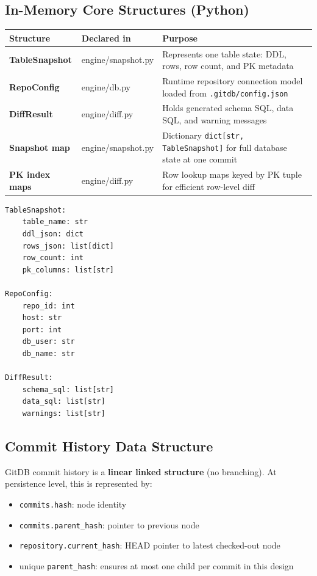 \documentclass[12pt, a4paper]{article}
\begin{document}
\subsection{In-Memory Core Structures (Python)}

\begin{center}
\renewcommand{\arraystretch}{1.3}
\begin{tabularx}{\textwidth}{>{\bfseries}p{3.0cm} >{\ttfamily}p{3.1cm} X}
\toprule
Structure & Declared in & Purpose \\
\midrule
TableSnapshot & engine/snapshot.py & Represents one table state: DDL, rows, row count, and PK metadata \\
RepoConfig & engine/db.py & Runtime repository connection model loaded from \texttt{.gitdb/config.json} \\
DiffResult & engine/diff.py & Holds generated schema SQL, data SQL, and warning messages \\
Snapshot map & engine/snapshot.py & Dictionary \texttt{dict[str, TableSnapshot]} for full database state at one commit \\
PK index maps & engine/diff.py & Row lookup maps keyed by PK tuple for efficient row-level diff \\
\bottomrule
\end{tabularx}
\end{center}

\begin{tcolorbox}[commandbox, title=Key Python Data Structures (Conceptual Form)]
\begin{lstlisting}
TableSnapshot:
    table_name: str
    ddl_json: dict
    rows_json: list[dict]
    row_count: int
    pk_columns: list[str]

RepoConfig:
    repo_id: int
    host: str
    port: int
    db_user: str
    db_name: str

DiffResult:
    schema_sql: list[str]
    data_sql: list[str]
    warnings: list[str]
\end{lstlisting}
\end{tcolorbox}

\subsection{Commit History Data Structure}

GitDB commit history is a \textbf{linear linked structure} (no branching).
At persistence level, this is represented by:
\begin{itemize}[leftmargin=1.5em]
        \item \texttt{commits.hash}: node identity
        \item \texttt{commits.parent\_hash}: pointer to previous node
        \item \texttt{repository.current\_hash}: HEAD pointer to latest checked-out node
        \item unique \texttt{parent\_hash}: ensures at most one child per commit in this design
\end{itemize}
\end{document}
